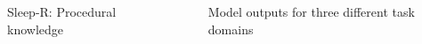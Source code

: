 \documentclass[final]{beamer}
\newlength{\sepwid}
\newlength{\onecolwid}
\newlength{\threecolwid}
\begin{document}
\begin{frame}[t]
\begin{columns}[t]
\begin{column}{\onecolwid}
\begin{block}{Sleep-R: Procedural knowledge}
\end{block}





\end{column} %

\begin{column}{\sepwid}\end{column} %

\begin{column}{\threecolwid} %

\begin{columns}[t,totalwidth=\threecolwid] %

\begin{column}{\threecolwid}\vspace{-.6in} %


\begin{block}{Model outputs for three different task domains}


\end{block}
\end{column}
\end{columns}
\end{column}
\end{columns}
\end{frame}
\end{document}
